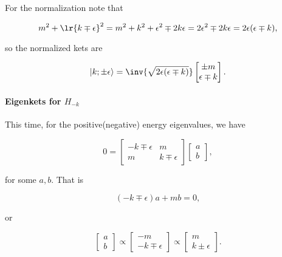For the normalization note that

\begin{dmath}\label{eqn:gradQuantumProblemSet4Problem3:200}
m^2 + \lr{ k \mp \epsilon }^2
=
m^2 + k^2 + \epsilon^2 \mp 2 k \epsilon
=
2 \epsilon^2 \mp 2 k \epsilon
= 
2 \epsilon (\epsilon \mp k),
\end{dmath}

so the normalized kets are

\begin{dmath}\label{eqn:gradQuantumProblemSet4Problem3:220}
\ket{k; \pm\epsilon} = 
\inv{\sqrt{2 \epsilon(\epsilon \mp k)}}
\begin{bmatrix}
\pm m \\
\epsilon \mp k
\end{bmatrix}.
\end{dmath}

\paragraph{Eigenkets for \( H_{-k} \)}

This time, for the positive(negative) energy eigenvalues, we have

\begin{dmath}\label{eqn:gradQuantumProblemSet4Problem3:141}
0 
=
\begin{bmatrix}
-k \mp \epsilon & m \\
m & k \mp \epsilon
\end{bmatrix}
\begin{bmatrix}
a \\
b
\end{bmatrix},
\end{dmath}

for some \( a, b\).  That is

\begin{dmath}\label{eqn:gradQuantumProblemSet4Problem3:161}
(-k \mp \epsilon) a + m b = 0,
\end{dmath}

or 

\begin{dmath}\label{eqn:gradQuantumProblemSet4Problem3:181}
\begin{bmatrix}
a \\
b
\end{bmatrix}
\propto
\begin{bmatrix}
- m \\
-k \mp \epsilon
\end{bmatrix}
\propto
\begin{bmatrix}
m \\
k \pm \epsilon
\end{bmatrix}.
\end{dmath}

